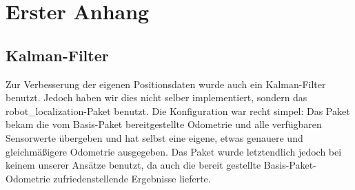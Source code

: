 \section{Erster Anhang}
	\subsection{Kalman-Filter}
	Zur Verbesserung der eigenen Positionsdaten wurde auch ein Kalman-Filter benutzt. Jedoch haben wir dies nicht selber implementiert, sondern das robot_localization-Paket benutzt. Die Konfiguration war recht simpel: Das Paket bekam die vom Basis-Paket bereitgestellte Odometrie und alle verfügbaren Sensorwerte übergeben und hat selbst eine eigene, etwas genauere und gleichmäßigere Odometrie ausgegeben. Das Paket wurde letztendlich jedoch bei keinem unserer Ansätze benutzt, da auch die bereit gestellte Basis-Paket-Odometrie zufriedenstellende Ergebnisse lieferte.